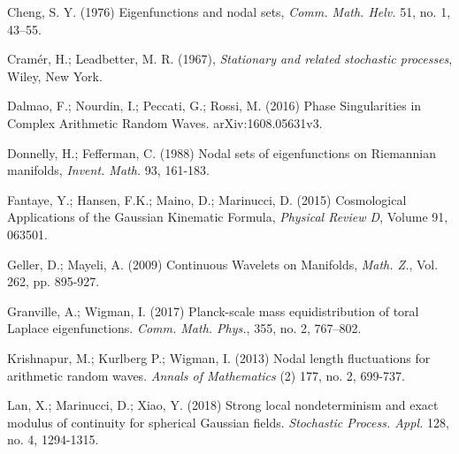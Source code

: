 \begin{thebibliography}{99}
	
	
	 Cheng, S. Y. (1976) Eigenfunctions and nodal sets, 	\textit{Comm. Math. Helv.} 51, no. 1, 43–55. 
	
	
	
	
	
	
	 Cramér, H.; Leadbetter, M. R. (1967), \textit{Stationary and related stochastic processes}, Wiley, New York.
	
	
	 Dalmao, F.; Nourdin, I.; Peccati, G.; Rossi, M. (2016) Phase Singularities in Complex	Arithmetic Random Waves. arXiv:1608.05631v3.
	
	 Donnelly, H.; Fefferman, C.  (1988) Nodal sets of eigenfunctions on Riemannian manifolds,
	\textit{ Invent. Math.} 93, 161-183.
	
	 Fantaye, Y.; Hansen, F.K.; Maino, D.; Marinucci, D. (2015) Cosmological Applications of the Gaussian Kinematic Formula, \textit{Physical Review D}, Volume 91, 063501.
	
	 Geller, D.; Mayeli, A. (2009) Continuous Wavelets on Manifolds, \textit{Math. Z.}, Vol. 262, pp. 895-927.
	
	  Granville, A.; Wigman, I. (2017) Planck-scale mass equidistribution of toral Laplace eigenfunctions. \textit{Comm. Math. Phys.}, 355, no. 2, 767–802.
	
	 Krishnapur, M.; Kurlberg P.; Wigman, I. (2013) Nodal length
	fluctuations for arithmetic random waves. \textit{Annals of Mathematics} (2)
	177, no. 2, 699-737.
	
	
	
	
	Lan, X.; Marinucci, D.; Xiao, Y. (2018) Strong local nondeterminism and exact modulus of continuity for spherical Gaussian fields.
	\textit{Stochastic Process. Appl.} 128, no. 4, 1294-1315. 
	

\end{thebibliography}
